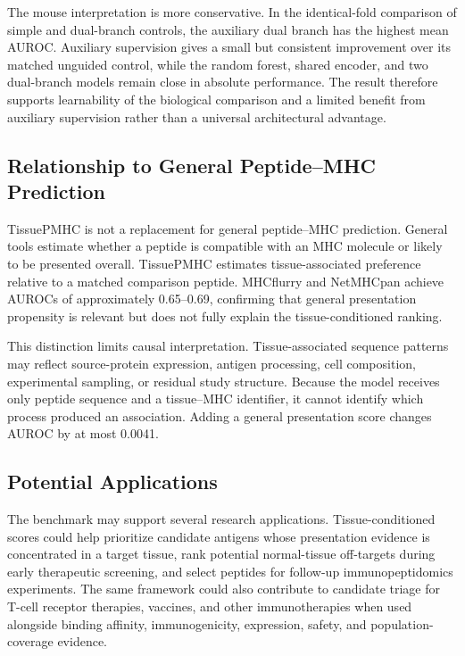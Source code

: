 The mouse interpretation is more conservative. In the identical-fold comparison of simple and dual-branch controls, the auxiliary dual branch has the highest mean AUROC. Auxiliary supervision gives a small but consistent improvement over its matched unguided control, while the random forest, shared encoder, and two dual-branch models remain close in absolute performance. The result therefore supports learnability of the biological comparison and a limited benefit from auxiliary supervision rather than a universal architectural advantage.

\subsection{Relationship to General Peptide--MHC Prediction}

TissuePMHC is not a replacement for general peptide--MHC prediction. General tools estimate whether a peptide is compatible with an MHC molecule or likely to be presented overall. TissuePMHC estimates tissue-associated preference relative to a matched comparison peptide. MHCflurry and NetMHCpan achieve AUROCs of approximately 0.65--0.69, confirming that general presentation propensity is relevant but does not fully explain the tissue-conditioned ranking.

This distinction limits causal interpretation. Tissue-associated sequence patterns may reflect source-protein expression, antigen processing, cell composition, experimental sampling, or residual study structure. Because the model receives only peptide sequence and a tissue--MHC identifier, it cannot identify which process produced an association. Adding a general presentation score changes AUROC by at most 0.0041.

\subsection{Potential Applications}

The benchmark may support several research applications. Tissue-conditioned scores could help prioritize candidate antigens whose presentation evidence is concentrated in a target tissue, rank potential normal-tissue off-targets during early therapeutic screening, and select peptides for follow-up immunopeptidomics experiments. The same framework could also contribute to candidate triage for T-cell receptor therapies, vaccines, and other immunotherapies when used alongside binding affinity, immunogenicity, expression, safety, and population-coverage evidence.

